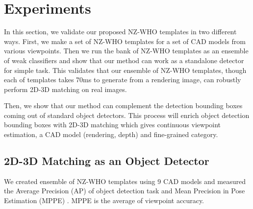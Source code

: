 \documentclass[10pt,twocolumn,letterpaper]{article}
\begin{document}
\section{Experiments}

In this section, we validate our proposed NZ-WHO templates in two different ways. First, we make a set of NZ-WHO templates for a set of CAD models from various viewpoints. Then we run the bank of NZ-WHO templates as an ensemble of weak classifiers and show that our method can work as a standalone detector for simple task. This validates that our ensemble of NZ-WHO templates, though each of templates takes 70ms to generate from a rendering image, can robustly perform 2D-3D matching on real images. 

Then, we show that our method can complement the detection bounding boxes coming out of standard object detectors. This process will enrich object detection bounding boxes with 2D-3D matching which gives continuous viewpoint estimation, a CAD model (rendering, depth) and fine-grained category.  

\subsection{2D-3D Matching as an Object Detector} 
We created ensemble of NZ-WHO templates using 9 CAD models and measured the Average Precision (AP) of object detection task and Mean Precision in Pose Estimation (MPPE) \cite{Lopez-Sastre11}. MPPE is the average of viewpoint accuracy.  
\end{document}
